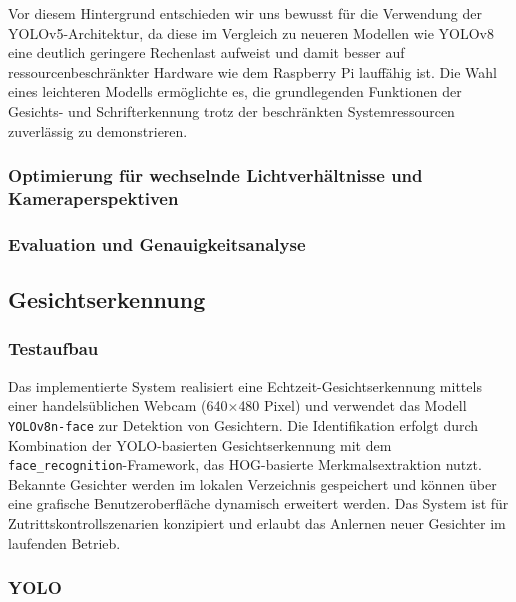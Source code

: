 Vor diesem Hintergrund entschieden wir uns bewusst für die Verwendung der YOLOv5-Architektur, da diese im Vergleich zu neueren Modellen wie YOLOv8 eine deutlich geringere Rechenlast aufweist und damit besser auf ressourcenbeschränkter Hardware wie dem Raspberry Pi lauffähig ist.
Die Wahl eines leichteren Modells ermöglichte es, die grundlegenden Funktionen der Gesichts- und Schrifterkennung trotz der beschränkten Systemressourcen zuverlässig zu demonstrieren. 
\subsubsection{Optimierung für wechselnde Lichtverhältnisse und Kameraperspektiven}
\subsubsection{Evaluation und Genauigkeitsanalyse}

\subsection{Gesichtserkennung}
\subsubsection{Testaufbau}
Das implementierte System realisiert eine Echtzeit-Gesichtserkennung mittels einer handelsüblichen Webcam (640$\times$480 Pixel) und verwendet das Modell \texttt{YOLOv8n-face} zur Detektion von Gesichtern. Die Identifikation erfolgt durch Kombination der YOLO-basierten Gesichtserkennung mit dem \texttt{face\_recognition}-Framework, das HOG-basierte Merkmalsextraktion nutzt. Bekannte Gesichter werden im lokalen Verzeichnis gespeichert und können über eine grafische Benutzeroberfläche dynamisch erweitert werden. Das System ist für Zutrittskontrollszenarien konzipiert und erlaubt das Anlernen neuer Gesichter im laufenden Betrieb.

\subsubsection{YOLO}
